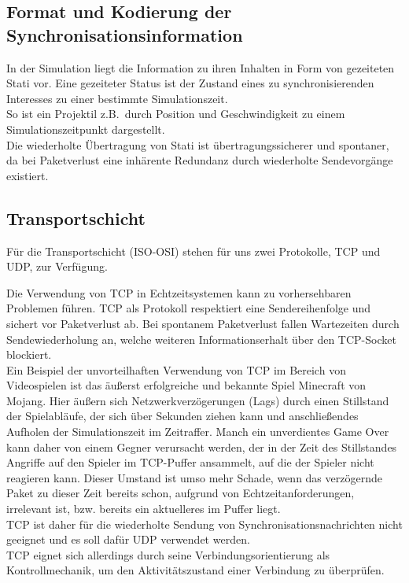 \documentclass[11pt,twoside,a4paper]{article}
\begin{document}
\subsection{Format und Kodierung der Synchronisationsinformation}
In der Simulation liegt die Information zu ihren Inhalten in Form von gezeiteten Stati vor.
Eine gezeiteter Status ist der Zustand eines zu synchronisierenden Interesses zu einer bestimmte Simulationszeit.\\
So ist ein Projektil z.B.~durch Position und Geschwindigkeit zu einem Simulationszeitpunkt dargestellt.\\
Die wiederholte Übertragung von Stati ist übertragungssicherer und spontaner, da bei Paketverlust eine inhärente Redundanz durch wiederholte Sendevorgänge existiert.


\subsection{Transportschicht}
Für die Transportschicht (ISO-OSI) stehen für uns zwei Protokolle, TCP und UDP, zur Verfügung.

Die Verwendung von TCP in Echtzeitsystemen kann zu vorhersehbaren Problemen führen. TCP als Protokoll respektiert eine Sendereihenfolge und sichert vor Paketverlust ab. 
Bei spontanem Paketverlust fallen Wartezeiten durch Sendewiederholung an, welche weiteren Informationserhalt über den TCP-Socket blockiert.\\
Ein Beispiel der unvorteilhaften Verwendung von TCP im Bereich von Videospielen ist das äußerst erfolgreiche und bekannte Spiel Minecraft von Mojang. Hier äußern sich Netzwerkverzögerungen (Lags) durch einen Stillstand der Spielabläufe, der sich über Sekunden ziehen kann und anschließendes Aufholen der Simulationszeit im Zeitraffer. Manch ein unverdientes Game Over kann daher von einem Gegner verursacht werden, der in der Zeit des Stillstandes Angriffe auf den Spieler im TCP-Puffer ansammelt, auf die der Spieler nicht reagieren kann. Dieser Umstand ist umso mehr Schade, wenn das verzögernde Paket zu dieser Zeit bereits schon, aufgrund von Echtzeitanforderungen, irrelevant ist, bzw. bereits ein aktuelleres im Puffer liegt.\\
TCP ist daher für die wiederholte Sendung von Synchronisationsnachrichten nicht geeignet und es soll dafür UDP verwendet werden.\\
TCP eignet sich allerdings durch seine Verbindungsorientierung als Kontrollmechanik, um den Aktivitätszustand einer Verbindung zu überprüfen.
\end{document}
